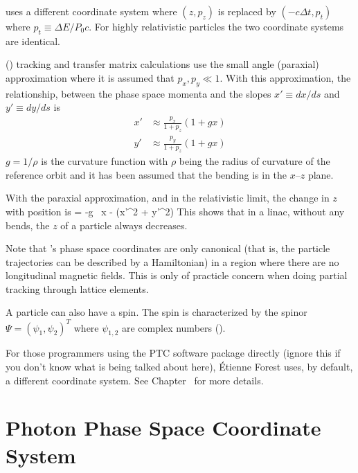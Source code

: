 \mad uses a different coordinate system where $(z, p_z)$ is
replaced by $(-c\Delta t, p_t)$ where $p_t \equiv \Delta E / P_0
c$. For highly relativistic particles the two coordinate systems are
identical.

 () tracking and transfer matrix
calculations use the small angle (paraxial) approximation where it is
assumed that $p_x, p_y \ll 1$. With this approximation, the
relationship, between the phase space momenta and the slopes $x' \equiv
dx/ds$ and $y' \equiv dy/ds$ is
\begin{align}
  x' &\approx \frac{p_x}{1 + p_z} (1 + g x) \\
  y' &\approx \frac{p_y}{1 + p_z} (1 + g x) 
  \label{xpa1p}
\end{align}
$g = 1/\rho$ is the curvature function with $\rho$ being the radius of
curvature of the reference orbit and it has been assumed that the
bending is in the $x$--$z$ plane. 

With the paraxial approximation, and in the relativistic limit, the
change in $z$ with position is
\Begineq
   = -g \, x -  (x'^2 + y'^2)
\Endeq
This shows that in a linac, without any bends, the $z$ of a particle
always decreases.

Note that \bmad's phase space coordinates are only canonical (that is,
the particle trajectories can be described by a Hamiltonian) in a
region where there are no longitudinal magnetic fields. This is
only of practicle concern when doing partial tracking through lattice
elements.

A particle can also have a spin. The spin is characterized by the
spinor $\Psi = \left( \psi_{1}, \psi_{2} \right)^{T}$ where
$\psi_{1,2}$ are complex numbers ().

For those programmers using the PTC
software package directly (ignore
this if you don't know what is being talked about here), \'Etienne Forest uses,
by default, a different coordinate system. See Chapter~ for more details.

\section{Photon Phase Space Coordinate System}
\label{s:photon.phase.space}

